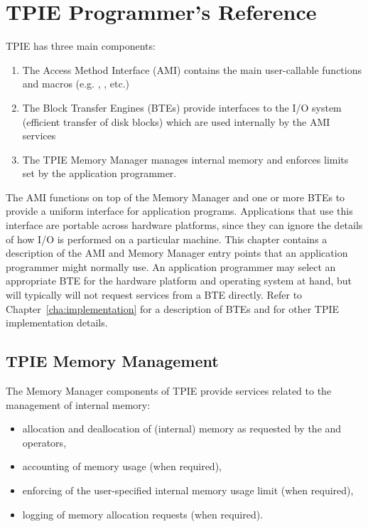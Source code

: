 \chapter{TPIE Programmer's Reference}



\noindent
TPIE has three main components:  
\begin{enumerate}
    \item The Access Method Interface (AMI) contains the
    main user-callable functions and macros (e.g.
    , , etc.)

    \item The Block Transfer Engines (BTEs) provide
    interfaces to the I/O system (efficient transfer of disk
    blocks) which are used internally by the AMI services
    
    \item The TPIE Memory Manager  manages
    internal memory and enforces limits set by the
    application programmer.
\end{enumerate}

The AMI functions on top of the Memory Manager and one or
more BTEs to provide a uniform interface for application
programs. Applications that use this interface are portable
across hardware platforms, since they can ignore the details
of how I/O is performed on a particular machine. This
chapter contains a description of the AMI and Memory Manager
entry points that an application programmer might normally
use. An application programmer may select an appropriate BTE
for the hardware platform and operating system at hand, but
will typically will not request services from a BTE
directly. Refer to Chapter~\ref{cha:implementation} for a
description of BTEs and for other TPIE implementation
details.


\section{TPIE Memory Management}

The Memory Manager components of TPIE provide services related to
the management of internal memory:
\begin{itemize}
\item allocation and deallocation of (internal)
memory as requested by the  and  operators,
\item accounting of memory usage (when required),
\item enforcing of the user-specified internal memory usage
limit (when required),
\item logging of memory allocation requests (when required).
\end{itemize}

